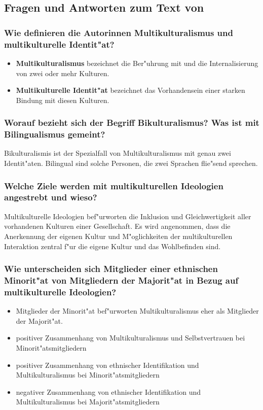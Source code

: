 \subsection{Fragen und Antworten zum Text von \textcite{nguyen_multicultural_2010}}
\subsubsection{Wie definieren die Autorinnen Multikulturalismus und multikulturelle Identit"at?}
\begin{itemize}
        \item \textbf{Multikulturalismus} bezeichnet die Ber"uhrung mit und die Internalisierung von zwei oder mehr Kulturen.
        \item \textbf{Multikulturelle Identit"at} bezeichnet das Vorhandensein einer starken Bindung mit diesen Kulturen.
\end{itemize}

\subsubsection{Worauf bezieht sich der Begriff Bikulturalismus? Was ist mit Bilingualismus gemeint?}
Bikulturalismis ist der Spezialfall von Multikulturalismus mit genau zwei Identit"aten. Bilingual sind solche Personen, die zwei Sprachen flie"send sprechen.

\subsubsection{Welche Ziele werden mit multikulturellen Ideologien angestrebt und wieso?}
Multikulturelle Ideologien bef"urworten die Inklusion und Gleichwertigkeit aller vorhandenen Kulturen einer Gesellschaft. Es wird angenommen, dass die Anerkennung der eigenen Kultur und M"oglichkeiten der multikulturellen Interaktion zentral f"ur die eigene Kultur und das Wohlbefinden sind. 

\subsubsection{Wie unterscheiden sich Mitglieder einer ethnischen Minorit"at von Mitgliedern der Majorit"at in Bezug auf multikulturelle Ideologien?}
\begin{itemize}
        \item Mitglieder der Minorit"at bef"urworten Multikulturalismus eher als Mitglieder der Majorit"at. 
        \item positiver Zusammenhang von Multikulturalismus und Selbstvertrauen bei Minorit"atsmitgliedern
        \item positiver Zusammenhang von ethnischer Identifikation und Multikulturalismus bei Minorit"atsmitgliedern
        \item negativer Zusammenhang von ethnischer Identifikation und Multikulturalismus bei Majorit"atsmitgliedern
\end{itemize}


